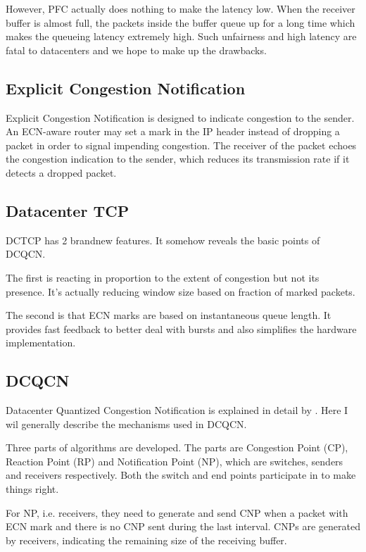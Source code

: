 \documentclass[12pt,a4paper]{article}
\begin{document}
However, PFC actually does nothing to make the latency low.
When the receiver buffer is almost full, the packets inside the buffer queue up for a long time which makes the queueing latency
extremely high.
Such unfairness and high latency are fatal to datacenters and we hope to make up the drawbacks.

\subsection{Explicit Congestion Notification}
Explicit Congestion Notification is designed to indicate congestion to the sender.
An ECN-aware router may set a mark in the IP header instead of dropping a packet in order to signal impending congestion.
The receiver of the packet echoes the congestion indication to the sender,
which reduces its transmission rate if it detects a dropped packet.

\subsection{Datacenter TCP}

DCTCP has 2 brandnew features. It somehow reveals the basic points of DCQCN.

The first is reacting in proportion to the extent of congestion but not its presence.
It's actually reducing window size based on fraction of marked packets.

The second is that ECN marks are based on instantaneous queue length.
It provides fast feedback to better deal with bursts and also simplifies the hardware implementation.

\subsection{DCQCN}
Datacenter Quantized Congestion Notification is explained in detail by \cite{dcqcn}.
Here I wil generally describe the mechanisms used in DCQCN.

Three parts of algorithms are developed.
The parts are Congestion Point (CP), Reaction Point (RP) and Notification Point (NP),
which are switches, senders and receivers respectively.
Both the switch and end points participate in to make things right.

For NP, i.e. receivers, they need to generate and send CNP when a packet with ECN mark and there is no CNP sent during the last interval.
CNPs are generated by receivers, indicating the remaining size of the receiving buffer.
\end{document}
